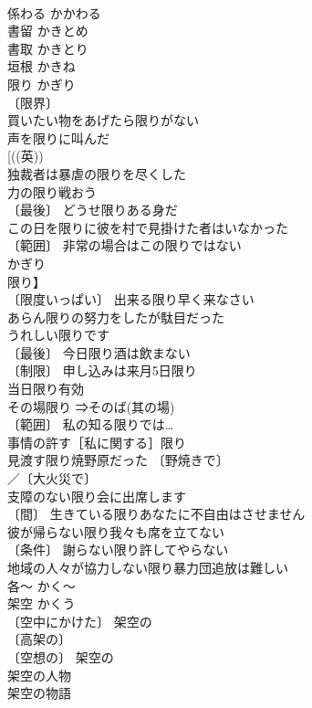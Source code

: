 \documentclass[8pt]{extreport}
\begin{document}
\begin{CJK}{UTF8}{min}
\\	係わる	かかわる	
\\	書留	かきとめ	
\\	書取	かきとり	
\\	垣根	かきね	
\\	限り	かぎり	
\\	〔限界〕
\\	買いたい物をあげたら限りがない 
\\	声を限りに叫んだ 
\\	[((英)) 
\\	独裁者は暴虐の限りを尽くした 
\\	力の限り戦おう 
\\	〔最後〕 どうせ限りある身だ 
\\	この日を限りに彼を村で見掛けた者はいなかった 
\\	〔範囲〕 非常の場合はこの限りではない 
\\	かぎり
\\	限り】 
\\	〔限度いっぱい〕 出来る限り早く来なさい 
\\	あらん限りの努力をしたが駄目だった 
\\	うれしい限りです 
\\	〔最後〕 今日限り酒は飲まない 
\\	〔制限〕 申し込みは来月5日限り 
\\	当日限り有効 
\\	その場限り ⇒そのば(其の場) 
\\	〔範囲〕 私の知る限りでは… 
\\	事情の許す［私に関する］限り 
\\	見渡す限り焼野原だった 〔野焼きで〕
\\	／〔大火災で〕
\\	支障のない限り会に出席します 
\\	〔間〕 生きている限りあなたに不自由はさせません 
\\	彼が帰らない限り我々も席を立てない 
\\	〔条件〕 謝らない限り許してやらない 
\\	地域の人々が協力しない限り暴力団追放は難しい 
\\	各～	かく～	
\\	架空	かくう	
\\	〔空中にかけた〕 架空の 
\\	〔高架の〕
\\	〔空想の〕 架空の 
\\	架空の人物 
\\	架空の物語 

\end{CJK}
\end{document}
